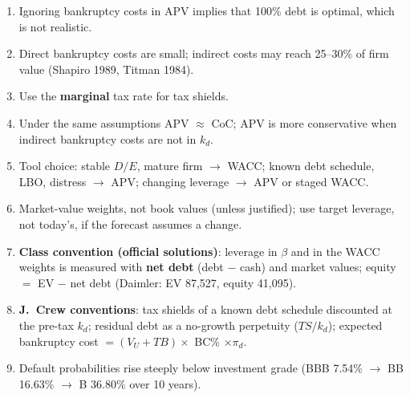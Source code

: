 \begin{trapbox}
\begin{enumerate}[leftmargin=*]
  \item Ignoring bankruptcy costs in APV implies that 100\% debt is optimal, which is not realistic.
  \item Direct bankruptcy costs are small; indirect costs may reach 25--30\% of firm value (Shapiro 1989, Titman 1984).
  \item Use the \textbf{marginal} tax rate for tax shields.
  \item Under the same assumptions APV $\approx$ CoC; APV is more conservative when indirect bankruptcy costs are not in $k_d$.
  \item Tool choice: stable $D/E$, mature firm $\to$ WACC; known debt schedule, LBO, distress $\to$ APV; changing leverage $\to$ APV or staged WACC.
  \item Market-value weights, not book values (unless justified); use target leverage, not today's, if the forecast assumes a change.
  \item \textbf{Class convention (official solutions)}: leverage in $\beta$ and in the WACC weights is measured with \textbf{net debt} (debt $-$ cash) and market values; equity $=$ EV $-$ net debt (Daimler: EV 87,527, equity 41,095).
  \item \textbf{J.\ Crew conventions}: tax shields of a known debt schedule discounted at the pre-tax $k_d$; residual debt as a no-growth perpetuity ($TS/k_d$); expected bankruptcy cost $=(V_U+TB)\times$ BC\% $\times\pi_d$.
  \item Default probabilities rise steeply below investment grade (BBB 7.54\% $\to$ BB 16.63\% $\to$ B 36.80\% over 10 years).
\end{enumerate}
\end{trapbox}
